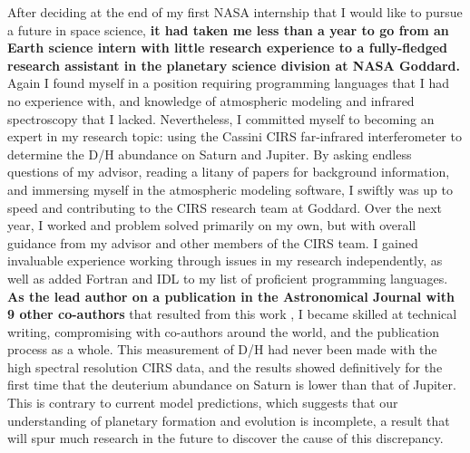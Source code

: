 After deciding at the end of my  first NASA internship that I would like to
pursue a future in space science, \textbf{it  had taken me less than a year to
go from an  Earth science intern with little research  experience to a
fully-fledged research assistant in  the planetary science division at
NASA Goddard.}  Again  I found  myself in  a position  requiring programming
languages that I had no  experience with, and knowledge of atmospheric
modeling  and infrared  spectroscopy that  I lacked.   Nevertheless, I
committed myself to becoming an expert in my research topic: using the
Cassini  CIRS   far-infrared  interferometer  to  determine   the  D/H
abundance on  Saturn and  Jupiter. By asking  endless questions  of my
advisor, reading  a litany of  papers for background  information, and
immersing myself in  the atmospheric modeling software,  I swiftly was
up  to   speed  and  contributing   to  the  CIRS  research   team  at
Goddard. Over the next year, I  worked and problem solved primarily on
my own, but with overall guidance from my advisor and other members of
the CIRS team.  I gained  invaluable experience working through issues
in my research  independently, as well as added Fortran  and IDL to my
list of  proficient programming  languages.  \textbf{As the  lead author  on a
publication in the  Astronomical Journal with 9  other co-authors} that
resulted  from  this work  \citep{Pierel:2017},  I  became skilled  at
technical writing, compromising with  co-authors around the world, and
the publication process as a whole.  This measurement of D/H had never
been made with the high spectral resolution CIRS data, and the results
showed definitively for the first time that the deuterium abundance on
Saturn is  lower than  that of  Jupiter. This  is contrary  to current
model predictions, which suggests  that our understanding of planetary
formation and  evolution is incomplete,  a result that will  spur much
research in the future to discover the cause of this discrepancy.

